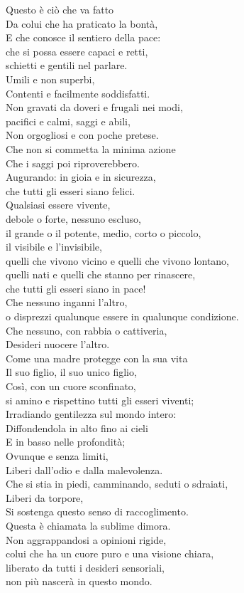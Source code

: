 Questo è ciò che va fatto \\
Da colui che ha praticato la bontà, \\
E che conosce il sentiero della pace: \\
che si possa essere capaci e retti, \\
schietti e gentili nel parlare. \\
Umili e non superbi, \\
Contenti e facilmente soddisfatti. \\
Non gravati da doveri e frugali nei modi, \\
pacifici e calmi, saggi e abili, \\
Non orgogliosi e con poche pretese. \\
Che non si commetta la minima azione \\
Che i saggi poi riproverebbero. \\
Augurando: in gioia e in sicurezza, \\
che tutti gli esseri siano felici. \\
Qualsiasi essere vivente, \\
debole o forte, nessuno escluso, \\
il grande o il potente, medio, corto o piccolo, \\
il visibile e l'invisibile, \\
quelli che vivono vicino e quelli che vivono lontano, \\
quelli nati e quelli che stanno per rinascere, \\
che tutti gli esseri siano in pace! \\
Che nessuno inganni l'altro, \\
o disprezzi qualunque essere in qualunque condizione. \\
Che nessuno, con rabbia o cattiveria, \\
Desideri nuocere l'altro. \\
Come una madre protegge con la sua vita \\
Il suo figlio, il suo unico figlio, \\
Così, con un cuore sconfinato, \\
si amino e rispettino tutti gli esseri viventi; \\
Irradiando gentilezza sul mondo intero: \\
Diffondendola in alto fino ai cieli \\
E in basso nelle profondità; \\
Ovunque e senza limiti, \\
Liberi dall'odio e dalla malevolenza. \\
Che si stia in piedi, camminando, seduti o sdraiati, \\
Liberi da torpore, \\
Si sostenga questo senso di raccoglimento. \\
Questa è chiamata la sublime dimora. \\
Non aggrappandosi a opinioni rigide, \\
colui che ha un cuore puro e una visione chiara, \\
liberato da tutti i desideri sensoriali, \\
non più nascerà in questo mondo. 

